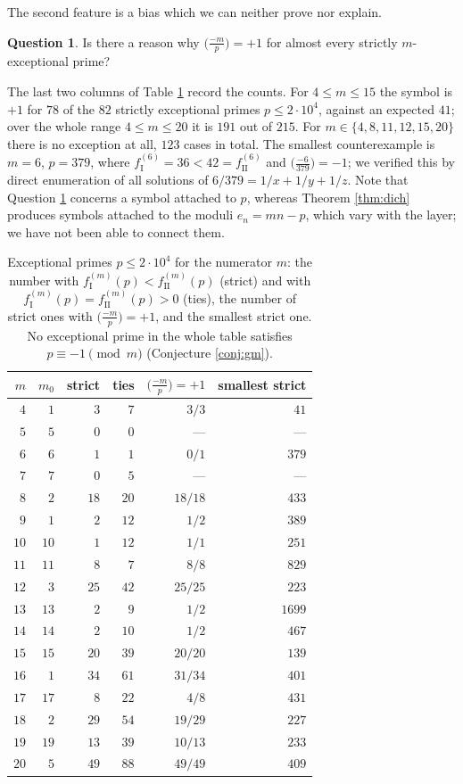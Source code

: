 \documentclass[11pt,reqno]{amsart}
\theoremstyle{plain}
\theoremstyle{definition}
\newtheorem{question}[theorem]{Question}
\numberwithin{equation}{section}
\newcommand{\fI}{f_{\mathrm{I}}}
\newcommand{\fII}{f_{\mathrm{II}}}
\begin{document}
The second feature is a bias which we can neither prove nor explain.

\begin{question}\label{q:legendre}
Is there a reason why $\bigl(\tfrac{-m}p\bigr)=+1$ for almost every strictly
$m$-exceptional prime?
\end{question}

The last two columns of Table \ref{tab:excm} record the counts. For $4\le m\le15$ the
symbol is $+1$ for $78$ of the $82$ strictly exceptional primes $p\le2\cdot10^{4}$,
against an expected $41$; over the whole range $4\le m\le20$ it is $191$ out of $215$.
For $m\in\{4,8,11,12,15,20\}$ there is no exception at all, $123$ cases in total. The
smallest counterexample is $m=6$, $p=379$, where $\fI^{(6)}=36<42=\fII^{(6)}$ and
$\bigl(\tfrac{-6}{379}\bigr)=-1$; we verified this by direct enumeration of all
solutions of $6/379=1/x+1/y+1/z$. Note that Question \ref{q:legendre} concerns a
symbol attached to $p$, whereas Theorem \ref{thm:dich} produces symbols attached to the
moduli $e_{n}=mn-p$, which vary with the layer; we have not been able to connect them.

\begin{table}[t]
\centering\small
\begin{tabular}{rr rr rr}
\toprule
$m$ & $m_{0}$ & strict & ties & $\bigl(\tfrac{-m}p\bigr)=+1$ & smallest strict\\
\midrule
$4$ & $1$ & $3$ & $7$ & $3/3$ & $41$\\
$5$ & $5$ & $0$ & $0$ & --- & ---\\
$6$ & $6$ & $1$ & $1$ & $0/1$ & $379$\\
$7$ & $7$ & $0$ & $5$ & --- & ---\\
$8$ & $2$ & $18$ & $20$ & $18/18$ & $433$\\
$9$ & $1$ & $2$ & $12$ & $1/2$ & $389$\\
$10$ & $10$ & $1$ & $12$ & $1/1$ & $251$\\
$11$ & $11$ & $8$ & $7$ & $8/8$ & $829$\\
$12$ & $3$ & $25$ & $42$ & $25/25$ & $223$\\
$13$ & $13$ & $2$ & $9$ & $1/2$ & $1699$\\
$14$ & $14$ & $2$ & $10$ & $1/2$ & $467$\\
$15$ & $15$ & $20$ & $39$ & $20/20$ & $139$\\
$16$ & $1$ & $34$ & $61$ & $31/34$ & $401$\\
$17$ & $17$ & $8$ & $22$ & $4/8$ & $431$\\
$18$ & $2$ & $29$ & $54$ & $19/29$ & $227$\\
$19$ & $19$ & $13$ & $39$ & $10/13$ & $233$\\
$20$ & $5$ & $49$ & $88$ & $49/49$ & $409$\\
\bottomrule
\end{tabular}
\caption{Exceptional primes $p\le2\cdot10^{4}$ for the numerator $m$: the number with
$\fI^{(m)}(p)<\fII^{(m)}(p)$ (strict) and with $\fI^{(m)}(p)=\fII^{(m)}(p)>0$ (ties),
the number of strict ones with $\bigl(\tfrac{-m}p\bigr)=+1$, and the smallest strict
one. No exceptional prime in the whole table satisfies $p\equiv-1\pmod m$
(Conjecture \ref{conj:gm}).}
\label{tab:excm}
\end{table}
\end{document}

